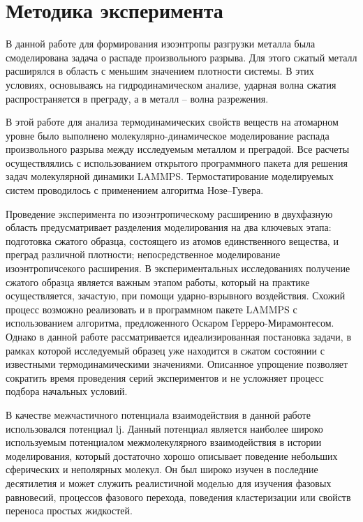 \section{\label{sec 2}Методика эксперимента}

В данной работе для формирования изоэнтропы разгрузки металла была смоделирована задача о распаде произвольного разрыва. Для этого сжатый металл расширялся в область с меньшим значением плотности системы. В этих условиях, основываясь на гидродинамическом анализе, ударная волна сжатия распространяется в преграду, а в металл – волна разрежения.

В этой работе для анализа термодинамических свойств веществ на атомарном уровне было выполнено 
молекулярно-динамическое моделирование распада произвольного разрыва между исследуемым металлом и преградой. Все расчеты осуществлялись с использованием открытого программного пакета для решения задач молекулярной динамики LAMMPS. Термостатирование моделируемых систем проводилось с применением алгоритма Нозе–Гувера.

Проведение эксперимента по изоэнтропическому расширению в двухфазную область предусматривает разделения моделирования
на два ключевых этапа: подготовка сжатого образца, состоящего из атомов единственного вещества, и преград различной 
плотности; непосредственное моделирование изоэнтропичсекого расширения. В экспериментальных исследованиях получение 
сжатого образца является важным этапом работы, который на практике осуществляется, зачастую, при помощи ударно-взрывного воздействия. Схожий процесс возможно реализовать и в программном пакете LAMMPS с использованием алгоритма, предложенного Оскаром Герреро-Мирамонтесом. Однако в данной работе рассматривается идеализированная постановка задачи, в рамках которой исследуемый образец уже находится в сжатом состоянии с известными термодинамическими значениями. Описанное упрощение позволяет сократить время проведения серий экспериментов и не усложняет процесс подбора начальных условий.

В качестве межчастичного потенциала взаимодействия в данной работе использовался потенциал \acrfull{lj}. Данный потенциал является наиболее широко используемым потенциалом межмолекулярного взаимодействия в истории моделирования, который достаточно хорошо описывает поведение небольших сферических и неполярных молекул. Он был широко изучен в последние десятилетия и может служить реалистичной моделью для изучения фазовых равновесий, процессов фазового перехода, поведения кластеризации или свойств переноса простых жидкостей.

